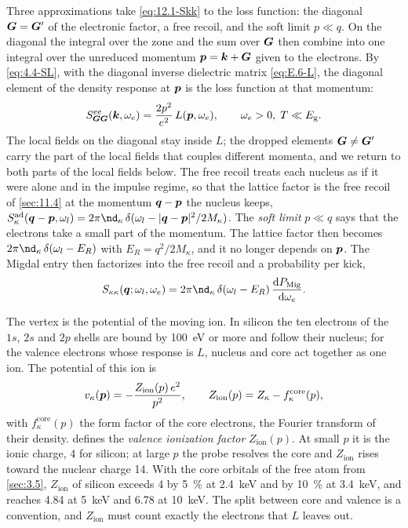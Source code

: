 Three approximations take \cref{eq:12.1-Skk} to the loss function: the diagonal $\bm{G} = \bm{G}'$ of the electronic factor, a free recoil, and the soft limit $p \ll q$. On the diagonal the integral over the zone and the sum over $\bm{G}$ then combine into one integral over the unreduced momentum $\bm{p} = \bm{k} + \bm{G}$ given to the electrons. By \cref{eq:4.4-SL}, with the diagonal inverse dielectric matrix \cref{eq:E.6-L}, the diagonal element of the density response at $\bm{p}$ is the loss function at that momentum:
\begin{equation}
  S^{ee}_{\bm{G}\bm{G}}(\bm{k},\omega_e) = \frac{2p^2}{e^2}\,L(\bm{p},\omega_e) , \qquad \omega_e > 0,\; T \ll E_{\mathrm{g}} .
  \label{eq:12.3-See}
\end{equation}
The local fields on the diagonal stay inside $L$; the dropped elements $\bm{G} \ne \bm{G}'$ carry the part of the local fields that couples different momenta, and we return to both parts of the local fields below. The free recoil treats each nucleus as if it were alone and in the impulse regime, so that the lattice factor is the free recoil of \cref{sec:11.4} at the momentum $\bm{q} - \bm{p}$ the nucleus keeps, $S^{\mathrm{ad}}_{\kappa}(\vect{q} - \vect{p},\omega_l) = 2\pi\nd_\kappa\,\delta(\omega_l - |\vect{q} - \vect{p}|^2/2M_\kappa)$. The \emph{soft limit} $p \ll q$ says that the electrons take a small part of the momentum. The lattice factor then becomes $2\pi\nd_\kappa\,\delta(\omega_l - E_R)$ with $E_R = q^2/2M_\kappa$, and it no longer depends on $\bm{p}$. The Migdal entry then factorizes into the free recoil and a probability per kick,
\begin{equation}
  S_{\kappa\kappa}(\vect{q};\omega_l,\omega_e) = 2\pi\nd_\kappa\,\delta(\omega_l - E_R)\,\frac{\dd P_{\mathrm{Mig}}}{\dd\omega_e} .
  \label{eq:12.3-factor}
\end{equation}

The vertex is the potential of the moving ion. In silicon the ten electrons of the $1s$, $2s$ and $2p$ shells are bound by \SI{100}{eV} or more and follow their nucleus; for the valence electrons whose response is $L$, nucleus and core act together as one ion. The potential of this ion is
\begin{equation}
  v_\kappa(\bm{p}) = -\frac{Z_{\mathrm{ion}}(p)\,e^2}{p^2} , \qquad Z_{\mathrm{ion}}(p) = Z_\kappa - f^{\mathrm{core}}_\kappa(p) ,
  \label{eq:12.3-Zion}
\end{equation}
with $f^{\mathrm{core}}_\kappa(p)$ the form factor of the core electrons, the Fourier transform of their density.  defines the \emph{valence ionization factor} $Z_{\mathrm{ion}}(p)$. At small $p$ it is the ionic charge, 4 for silicon; at large $p$ the probe resolves the core and $Z_{\mathrm{ion}}$ rises toward the nuclear charge 14. With the core orbitals of the free atom from \cref{sec:3.5}, $Z_{\mathrm{ion}}$ of silicon exceeds 4 by \SI{5}{\percent} at \SI{2.4}{keV} and by \SI{10}{\percent} at \SI{3.4}{keV}, and reaches 4.84 at \SI{5}{keV} and 6.78 at \SI{10}{keV}. The split between core and valence is a convention, and $Z_{\mathrm{ion}}$ must count exactly the electrons that $L$ leaves out.

